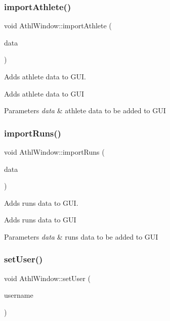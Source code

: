 \subsubsection{\texorpdfstring{importAthlete()}{importAthlete()}}
{\footnotesize\ttfamily void Athl\+Window\+::import\+Athlete (\begin{DoxyParamCaption}\item[{\mbox{\hyperlink{classAthleteDataContainer}{Athlete\+Data\+Container}}}]{data }\end{DoxyParamCaption})}



Adds athlete data to G\+UI. 

Adds athlete data to G\+UI 
\begin{DoxyParams}{Parameters}
{\em data} & athlete data to be added to G\+UI \\
\hline
\end{DoxyParams}
\mbox{\label{classAthlWindow_a827f6b24d61d7edd73b4e34dbb0f4975}} 
\subsubsection{\texorpdfstring{importRuns()}{importRuns()}}
{\footnotesize\ttfamily void Athl\+Window\+::import\+Runs (\begin{DoxyParamCaption}\item[{\mbox{\hyperlink{classRunsDataContainer}{Runs\+Data\+Container}}}]{data }\end{DoxyParamCaption})}



Adds runs data to G\+UI. 

Adds runs data to G\+UI 
\begin{DoxyParams}{Parameters}
{\em data} & runs data to be added to G\+UI \\
\hline
\end{DoxyParams}
\mbox{\label{classAthlWindow_a5a6293ca225dd40912c7099d166956a8}} 
\subsubsection{\texorpdfstring{setUser()}{setUser()}}
{\footnotesize\ttfamily void Athl\+Window\+::set\+User (\begin{DoxyParamCaption}\item[{std\+::string}]{username }\end{DoxyParamCaption})}



